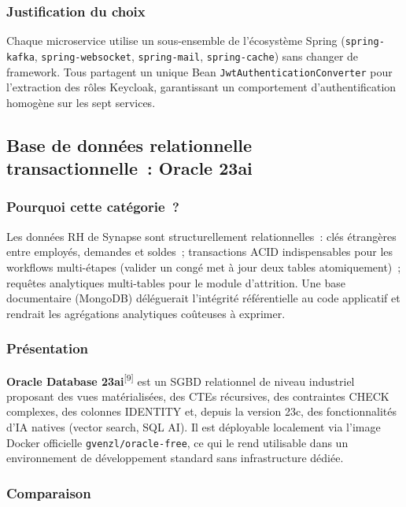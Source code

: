 \subsubsection*{Justification du choix}

Chaque microservice utilise un sous-ensemble de l'écosystème Spring (\texttt{spring-kafka}, \texttt{spring-websocket}, \texttt{spring-mail}, \texttt{spring-cache}) sans changer de framework. Tous partagent un unique Bean \texttt{JwtAuthenticationConverter} pour l'extraction des rôles Keycloak, garantissant un comportement d'authentification homogène sur les sept services.

\subsection{Base de données relationnelle transactionnelle~: Oracle 23ai}

\subsubsection*{Pourquoi cette catégorie~?}

Les données RH de Synapse sont structurellement relationnelles~: clés étrangères entre employés, demandes et soldes~; transactions ACID indispensables pour les workflows multi-étapes (valider un congé met à jour deux tables atomiquement)~; requêtes analytiques multi-tables pour le module d'attrition. Une base documentaire (MongoDB) déléguerait l'intégrité référentielle au code applicatif et rendrait les agrégations analytiques coûteuses à exprimer.

\subsubsection*{Présentation}

\textbf{Oracle Database 23ai}\textsuperscript{[9]} est un SGBD relationnel de niveau industriel proposant
des vues matérialisées, des CTEs récursives, des contraintes CHECK complexes, des
colonnes IDENTITY et, depuis la version 23c, des fonctionnalités d'IA natives
(vector search, SQL AI). Il est déployable localement via l'image Docker officielle
\texttt{gvenzl/oracle-free}, ce qui le rend utilisable dans un environnement de
développement standard sans infrastructure dédiée.

\subsubsection*{Comparaison}

